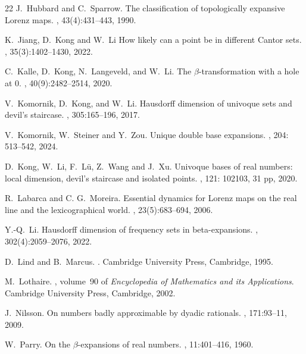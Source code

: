 \documentclass[11pt]{amsart}
\theoremstyle{definition}
\theoremstyle{remark}
\numberwithin{equation}{section}
\begin{document}
\begin{thebibliography}{22}
J.~Hubbard and C.~Sparrow.
\newblock The classification of topologically expansive Lorenz maps.
, 43(4):431--443, 1990.

{
K.~Jiang, D.~Kong and W.~Li
\newblock How likely can a point be in different Cantor sets.
, 35(3):1402--1430, 2022.
}

C.~Kalle, D.~Kong, N.~Langeveld, and W.~Li.
\newblock The $\beta$-transformation with a hole at 0.
, 40(9):2482--2514, 2020.

V.~Komornik, D.~Kong, and W.~Li.
\newblock Hausdorff dimension of univoque sets and devil's staircase.
, 305:165--196, 2017.

V.~Komornik, W.~Steiner and Y.~Zou.
\newblock Unique double base expansions.
{, 204: 513--542, 2024.}

{
D.~Kong, W.~Li, F.~L\"u, Z.~Wang and J.~Xu.
\newblock Univoque bases of real numbers: local dimension, devil's staircase and isolated points.
, 121: 102103, 31 pp, 2020.
}

R.~Labarca and C. G.~Moreira.
\newblock Essential dynamics for Lorenz maps on the real line and the lexicographical world.
, 23(5):683--694, 2006.

Y.-Q.~Li.
\newblock Hausdorff dimension of frequency sets in beta-expansions.
, 302(4):2059--2076, 2022.

D.~Lind and B.~Marcus.
.
\newblock Cambridge University Press, Cambridge, 1995.

M.~Lothaire.
, volume~90 of {\em Encyclopedia of Mathematics and its Applications}.
\newblock Cambridge University Press, Cambridge, 2002.

J.~Nilsson.
\newblock On numbers badly approximable by dyadic rationals.
, 171:93--11, 2009.

W.~Parry.
\newblock On the $\beta$-expansions of real numbers.
, 11:401--416, 1960.


\end{thebibliography}
\end{document}
